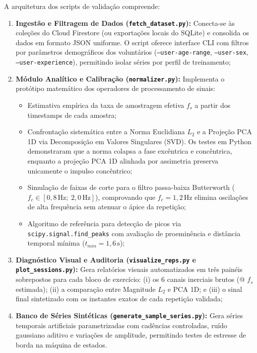 \documentclass[12pt]{article}
\begin{document}
A arquitetura dos scripts de validação compreende:
\begin{enumerate}
    \item \textbf{Ingestão e Filtragem de Dados (\texttt{fetch\_dataset.py}):} Conecta-se às coleções do Cloud Firestore (ou exportações locais do SQLite) e consolida os dados em formato JSON uniforme. O script oferece interface CLI com filtros por parâmetros demográficos dos voluntários (\texttt{--user-age-range}, \texttt{--user-sex}, \texttt{--user-experience}), permitindo isolar séries por perfil de treinamento;
    \item \textbf{Módulo Analítico e Calibração (\texttt{normalizer.py}):} Implementa o protótipo matemático dos operadores de processamento de sinais:
    \begin{itemize}
        \item Estimativa empírica da taxa de amostragem efetiva $f_s$ a partir dos timestamps de cada amostra;
        \item Confrontação sistemática entre a Norma Euclidiana $L_2$ e a Projeção PCA 1D via Decomposição em Valores Singulares (SVD). Os testes em Python demonstraram que a norma colapsa a fase excêntrica e concêntrica, enquanto a projeção PCA 1D alinhada por assimetria preserva unicamente o impulso concêntrico;
        \item Simulação de faixas de corte para o filtro passa-baixa Butterworth ($f_c \in [0{,}8\,\text{Hz};\; 2{,}0\,\text{Hz}]$), comprovando que $f_c = 1{,}2\,\text{Hz}$ elimina oscilações de alta frequência sem atenuar o ápice da repetição;
        \item Algoritmo de referência para detecção de picos via \texttt{scipy.signal.find\_peaks} com avaliação de proeminência e distância temporal mínima ($t_{min} = 1{,}6\,\text{s}$);
    \end{itemize}
    \item \textbf{Diagnóstico Visual e Auditoria (\texttt{visualize\_reps.py} e \texttt{plot\_sessions.py}):} Gera relatórios visuais automatizados em três painéis sobrepostos para cada bloco de exercício: (i) os 6 canais inerciais brutos (@ $f_s$ estimada); (ii) a comparação entre Magnitude $L_2$ e PCA 1D; e (iii) o sinal final sintetizado com os instantes exatos de cada repetição validada;
    \item \textbf{Banco de Séries Sintéticas (\texttt{generate\_sample\_series.py}):} Gera séries temporais artificiais parametrizadas com cadências controladas, ruído gaussiano aditivo e variações de amplitude, permitindo testes de estresse de borda na máquina de estados.
\end{enumerate}
\end{document}
